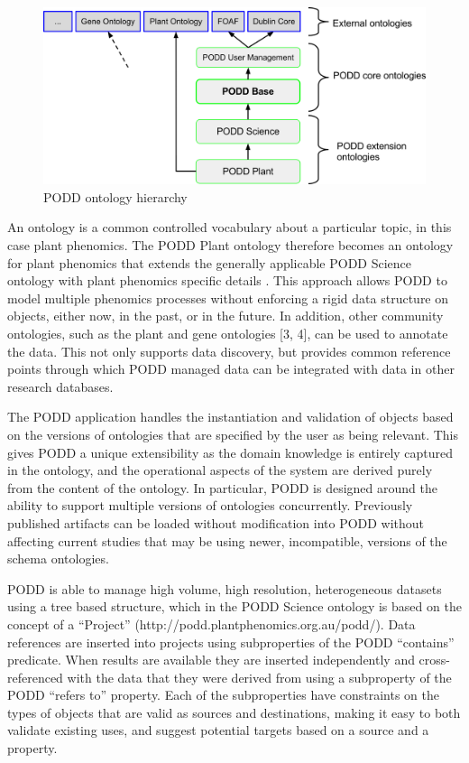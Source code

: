 \documentclass{llncs}
\begin{document}
\begin{figure}
\begin{center}
 \includegraphics[width=12cm,keepaspectratio=true]{podd-ontologies-figure2.png}

\caption{PODD ontology hierarchy}
\label{poddontologies}
\end{center}
\end{figure}


An ontology is a common controlled vocabulary about a particular topic, in this
case plant phenomics. The PODD Plant ontology therefore becomes an ontology for
plant phenomics that extends the generally applicable PODD Science ontology with
plant phenomics specific details \cite{Li2010}. This approach allows PODD to model
multiple phenomics processes without enforcing a rigid data structure on
objects, either now, in the past, or in the future. In addition, other community
ontologies, such as the plant and gene ontologies [3, 4], can be used to
annotate the data. This not only supports data discovery, but provides common
reference points through which PODD managed data can be integrated with data in
other research databases.


The PODD application handles the instantiation and validation of objects based
on the versions of ontologies that are specified by the user as being relevant.
This gives PODD a unique extensibility as the domain knowledge is entirely
captured in the ontology, and the operational aspects of the system are derived
purely from the content of the ontology. In particular, PODD is designed around
the ability to support multiple versions of ontologies concurrently. Previously
published artifacts can be loaded without modification into PODD without
affecting current studies that may be using newer, incompatible, versions of the
schema ontologies.


PODD is able to manage high volume, high resolution, heterogeneous datasets
using a tree based structure, which in the PODD Science ontology is based on the
concept of a ``Project'' (http://podd.plantphenomics.org.au/podd/). Data
references are inserted into projects using subproperties of the PODD
``contains'' predicate. When results are available they are inserted
independently and cross-referenced with the data that they were derived from
using a subproperty of the PODD ``refers to'' property. Each of the
subproperties have constraints on the types of objects that are valid as sources
and destinations, making it easy to both validate existing uses, and suggest
potential targets based on a source and a property.
\end{document}
